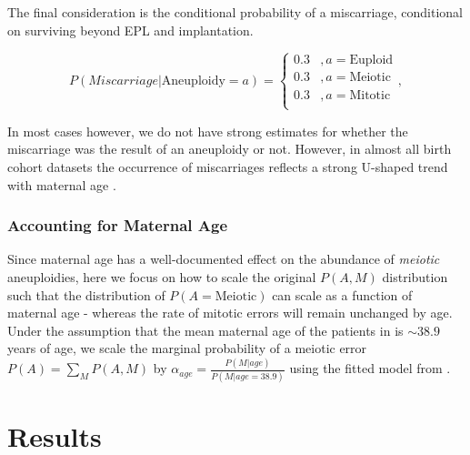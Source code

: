 \documentclass{article}
\begin{document}
The final consideration is the conditional probability of a miscarriage, conditional on surviving beyond EPL and implantation. 

\begin{equation}
	P(Miscarriage | \text{Aneuploidy}=a) = \begin{cases}
	0.3 &, a= \text{Euploid}\\
	0.3 &, a = \text{Meiotic}\\
	0.3 &, a = \text{Mitotic}\\
	\end{cases},
\end{equation}

In most cases however, we do not have strong estimates for whether the miscarriage was the result of an aneuploidy or not. However, in almost all birth cohort datasets the occurrence of miscarriages reflects a strong U-shaped trend  with maternal age \citep{Gruhn2019-al}. 


\subsubsection*{Accounting for Maternal Age} 

Since maternal age has a well-documented effect on the abundance of \textit{meiotic} aneuploidies, here we focus on how to scale the original $P(A,M)$ distribution such that the distribution of $P(A = \text{Meiotic})$ can scale as a function of maternal age - whereas the rate of mitotic errors will remain unchanged by age. Under the assumption that the mean maternal age of the patients in \citep{McCoy2023-dg} is $\sim 38.9$ years of age, we scale the marginal probability of a meiotic error $P(A) = \sum_M P(A,M)$ by $\alpha_{age} = \frac{P(M | age)}{P(M | age = 38.9)}$ using the fitted model from \citep{Gruhn2019-al}.


\section*{Results}





\end{document}
